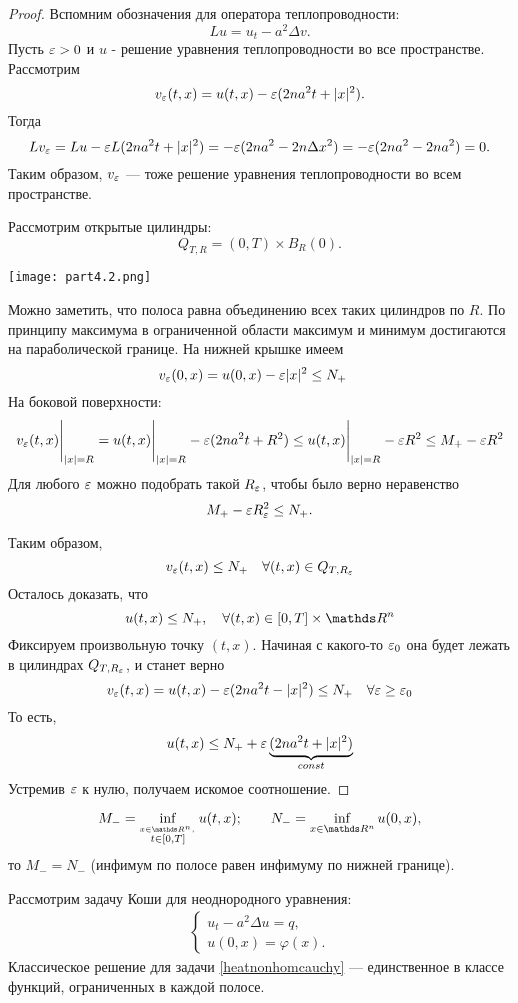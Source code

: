 \begin{proof}
Вспомним обозначения для оператора теплопроводности:
$$ Lu = u_t - a^2 \Delta v.$$
Пусть $\varepsilon >0 $ и $u$ - решение уравнения теплопроводности во все пространстве. Рассмотрим
$$v_\varepsilon(t, x) = u(t, x) - \varepsilon(2na^2t + \lvert x\rvert^2).$$
Тогда
$$Lv_\varepsilon = Lu - \varepsilon L(2na^2t + \lvert x\rvert^2) = -\varepsilon(2na^2 - 2n\Delta x^2) = -\varepsilon(2na^2 - 2na^2) = 0.$$
Таким образом, $v_\varepsilon$ --- тоже решение уравнения теплопроводности во всем пространстве.

Рассмотрим открытые цилиндры: $$Q_{T,R} = (0,T)\times B_R(0).$$

\begin{center}
\texttt{[image: part4.2.png]}
\end{center}

Можно заметить, что полоса равна объединению всех таких цилиндров по $R$. По принципу максимума в ограниченной области максимум и минимум достигаются на параболической границе. На нижней крышке имеем
$$ v_\varepsilon (0,x) = u(0,x) - \varepsilon |x|^2 \leq N_+ \quad$$
На боковой поверхности:
$$v_\varepsilon(t,x)\Bigg\rvert_{\lvert x\rvert = R} = u(t,x) \Bigg\rvert_{\lvert x\rvert = R} - \varepsilon(2na^2t + R^2) \leq u(t,x)\Bigg\rvert_{\lvert x\rvert = R} - \varepsilon R^2 \leq M_+ - \varepsilon R^2$$
Для любого $\varepsilon$ можно подобрать такой $R_\varepsilon$, чтобы было верно неравенство $$ M_+ - \varepsilon R^2_\varepsilon \leq N_+.$$

Таким образом,
$$ v_\varepsilon (t, x) \leq N_+ \quad \forall (t,x) \in {Q_{T, R_\varepsilon}}$$
Осталось доказать, что
$$u(t,x) \leq N_+, \quad \forall (t,x) \in [0, T] \times \real^n$$
Фиксируем произвольную точку $(t,x)$. Начиная с какого-то $\varepsilon_0$ она будет лежать в цилиндрах $Q_{T, R_\varepsilon}$, и станет верно
$$v_\varepsilon(t,x) = u(t,x) - \varepsilon(2na^2t - \lvert x\rvert^2) \leq N_+ \quad \forall \varepsilon \geq \varepsilon_0$$
То есть,
$$u(t,x) \leq N_+ + \varepsilon \underbrace{(2na^2t + |x|^2)}_{const}$$
Устремив $\varepsilon$ к нулю, получаем искомое соотношение.

\end{proof}

\begin{corollary}
$$M_- = \inf_{\stackrel{x \in \real^n, \,} {t \in [0, T]}}u(t,x); \qquad N_- = \inf_{x \in \real^n}u(0,x),$$
то $M_-=N_-$ (инфимум по полосе равен инфимуму по нижней границе).
\end{corollary}

\begin{corollary}[Единственность]
Рассмотрим задачу Коши для неоднородного уравнения:
\begin{align}
    \begin{cases} 
        u_t - a^2 \Delta u = q, \\
        u (0, x) = \varphi (x).
    \end{cases}
\label{heatnonhomcauchy}
\end{align}
Классическое решение для задачи \eqref{heatnonhomcauchy} --- единственное в классе функций, ограниченных в каждой полосе.
\end{corollary}

